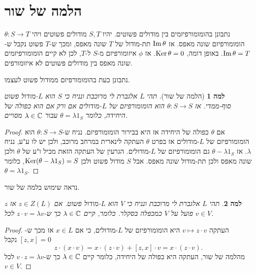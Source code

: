 \documentclass{report}
\theoremstyle{break}
\newtheorem{lemma}[lemma]{למה}
\theoremstyle{MyNonumberbreak}
\newtheorem{proof}{הוכחה}
\begin{document}
\section{הלמה של שור}
נתבונן בהומומורפיזמים בין מודולים פשוטים. יהיו $S, T$ מודולים פשוטים ויהי $\theta : S \to T$ הומומורפיזם שונה מאפס. אז $\operatorname{Im}\theta$ תת-מודול של $T$ שונה מאפס, ומכך ש-$T$ פשוט נקבל ש-$\operatorname{Im}\theta = T$. באופן דומה, $\operatorname{Ker}\theta = 0$. אז $\phi$ איזומורפיזם מ-$S$ ל-$T$, לכן לא קיים הומומורפיזמים שונה מאפס בין מודולים פשוטים לא איזומורפים.

נתבונן כעת בהומומורפיזם ממודול פשוט לעצמו.
\begin{lemma}[הלמה של שור]
	תהי $L$ אלגברת לי מרוכבת ונניח כי $S$ הוא $L$-מודול פשוט סוף-ממדי. אז $\theta : S \to S$ הוא הומומורפיזם של $L$-מודולים אם ורק אם הוא כפולה של היחידה, כלומר $\theta = \lambda 1_S$ עבור $\lambda \in \operatorname{\mathbb{C}}$ מסויים.
\end{lemma}
\begin{proof}
	אם $\theta$ כפולה של היחידה אז היא בבירור הומומורפיזם. נניח ש-$\theta : S \to S$ הוא הומומורפיזם של $L$-מודולים אז בפרט $\theta$ העתקה לינארית במרחב מרוכב, ולכן יש לו ע"ע, נניח $\lambda$. אז $\theta - \lambda 1_S$ גם הומומורפיזם של $L$-מודולים. הגרעין של העתקה הזאת מכיל ו"ע של $\theta$ ולכן שונה מאפס ולכן תת-מודול שונה מאפס. אבל $S$ מודול פשוט ולכן $\operatorname{Ker}(\theta - \lambda 1_S) = S$, כלומר $\theta = \lambda 1_S$.
\end{proof}
נראה שימוש בלמה של שור.
\begin{lemma}
	תהי $L$ אלגברת לי מרוכבת ונניח כי $V$ הוא $L$-מודול פשוט. אם $z \in Z(L)$ אז $z$ פועל על $V$ כמכפלה בסקלר. כלומר, קיים $\lambda \in \operatorname{\mathbb{C}}$ כך ש-$z \cdot v = \lambda v$ לכל $v \in V$.
\end{lemma}
\begin{proof}
	העתקה $v \mapsto z \cdot v$ היא הומומורפיזם של $L$-מודולים, כי אם $x \in L$ אז מכך ש-$[z, x] = 0$ נקבל
	\[ z \cdot (x \cdot v) = x \cdot (z \cdot v) + [z, x] \cdot v = x \cdot (z \cdot v). \]
	מהלמה של שור, העתקה היא כפולה של היחידה, כלומר קיים $\lambda \in \operatorname{\mathbb{C}}$ כך ש-$v \cdot z = \lambda v$ לכל $v \in V$.
\end{proof}
\end{document}

